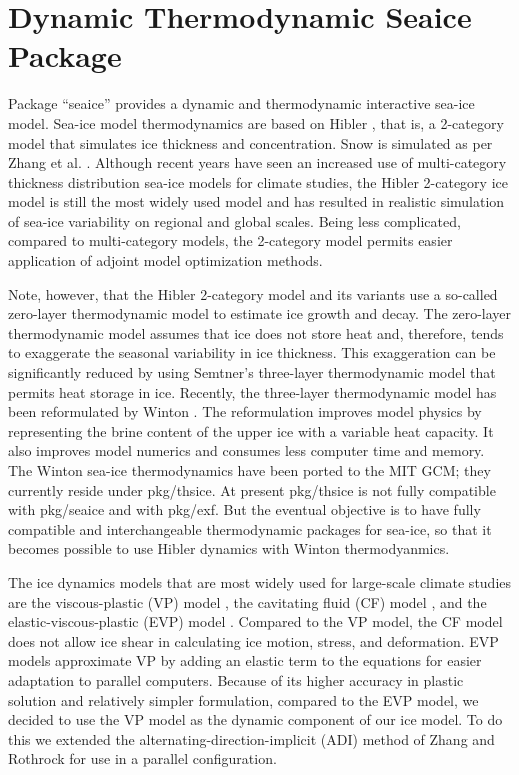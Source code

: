 
\chapter{Dynamic Thermodynamic Seaice Package}
  
Package ``seaice'' provides a dynamic and thermodynamic interactive sea-ice
model.  Sea-ice model thermodynamics are based on Hibler \cite{hib80}, that
is, a 2-category model that simulates ice thickness and concentration.  Snow
is simulated as per Zhang et al. \cite{zha98a}.  Although recent years have
seen an increased use of multi-category thickness distribution sea-ice models
for climate studies, the Hibler 2-category ice model is still the most widely
used model and has resulted in realistic simulation of sea-ice variability on
regional and global scales.  Being less complicated, compared to
multi-category models, the 2-category model permits easier application of
adjoint model optimization methods.

Note, however, that the Hibler 2-category model and its variants use a
so-called zero-layer thermodynamic model to estimate ice growth and decay.
The zero-layer thermodynamic model assumes that ice does not store heat and,
therefore, tends to exaggerate the seasonal variability in ice thickness.
This exaggeration can be significantly reduced by using Semtner's \cite{sem76}
three-layer thermodynamic model that permits heat storage in ice.  Recently,
the three-layer thermodynamic model has been reformulated by Winton
\cite{win00}.  The reformulation improves model physics by representing the
brine content of the upper ice with a variable heat capacity.  It also
improves model numerics and consumes less computer time and memory.  The
Winton sea-ice thermodynamics have been ported to the MIT GCM; they currently
reside under pkg/thsice.  At present pkg/thsice is not fully compatible with
pkg/seaice and with pkg/exf.  But the eventual objective is to have fully
compatible and interchangeable thermodynamic packages for sea-ice, so that it
becomes possible to use Hibler dynamics with Winton thermodyanmics.

The ice dynamics models that are most widely used for large-scale
climate studies are the viscous-plastic (VP) model \cite{hib79}, the
cavitating fluid (CF) model \cite{fla92}, and the
elastic-viscous-plastic (EVP) model \cite{hun97}.  Compared to the VP
model, the CF model does not allow ice shear in calculating ice
motion, stress, and deformation.  EVP models approximate VP by adding
an elastic term to the equations for easier adaptation to parallel
computers.  Because of its higher accuracy in plastic solution and
relatively simpler formulation, compared to the EVP model, we decided
to use the VP model as the dynamic component of our ice model.  To do
this we extended the alternating-direction-implicit (ADI) method of
Zhang and Rothrock \cite{zha00} for use in a parallel configuration.

